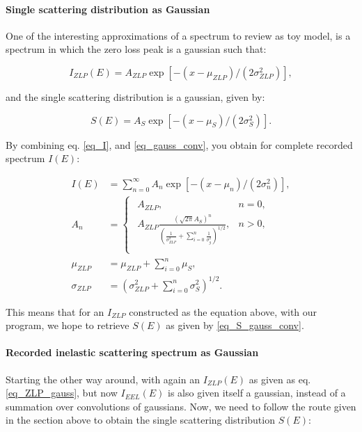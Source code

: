 \paragraph{Single scattering distribution as Gaussian}
One of the interesting approximations of a spectrum to review as toy model, is a spectrum in which the zero loss peak is a gaussian such that:

\begin{equation}\label{eq_ZLP_gauss}
I_{ZLP}(E) = A_{ZLP} \exp{[-(x-\mu_{ZLP})/(2\sigma_{ZLP}^2)]},
\end{equation}

and the single scattering distribution is a gaussian, given by:

\begin{equation}\label{eq_S_gauss_conv}
S(E) = A_{S} \exp{[-(x-\mu_{S})/(2\sigma_{S}^2)]}.
\end{equation}


By combining eq. \eqref{eq_I}, and \eqref{eq_gauss_conv}, you obtain for complete recorded spectrum $I(E)$:

\begin{equation}\label{eq_I_gauss_conv}
\begin{aligned}
I(E) &= \sum_{n=0}^{\infty}  A_{n} \exp{[-(x-\mu_{n})/(2\sigma_{n}^2)]},\\
A_{n} &= 
\begin{cases}
\begin{aligned}
A_{ZLP}, &n=0, \\ 
A_{ZLP} \frac{\left(\sqrt{2 \pi} A_S\right)^n}{\left(\frac{1}{\sigma_{ZLP}^{2}}+\sum_{i=0}^n \frac{1}{\sigma_g^{2}}\right)^{1/2}}, &n>0, \\
\end{aligned}
\end{cases}\\
\mu_{ZLP} &= \mu_{ZLP} + \sum_{i=0}^n \mu_S,\\
\sigma_{ZLP} &= (\sigma_{ZLP}^2 + \sum_{i=0}^n \sigma_S^2)^{1/2}.
\end{aligned}
\end{equation}

This means that for an $I_{ZLP}$ constructed as the equation above, with our program, we hope to retrieve $S(E)$ as given by \eqref{eq_S_gauss_conv}.



\paragraph{Recorded inelastic scattering spectrum as Gaussian}
Starting the other way around, with again an $I_{ZLP}(E)$ as given as eq. \eqref{eq_ZLP_gauss}, but now $I_{EEL}(E)$ is also given itself a gaussian, instead of a summation over convolutions of gaussians. Now, we need to follow the route given in the section above to obtain the single scattering distribution $S(E)$:


